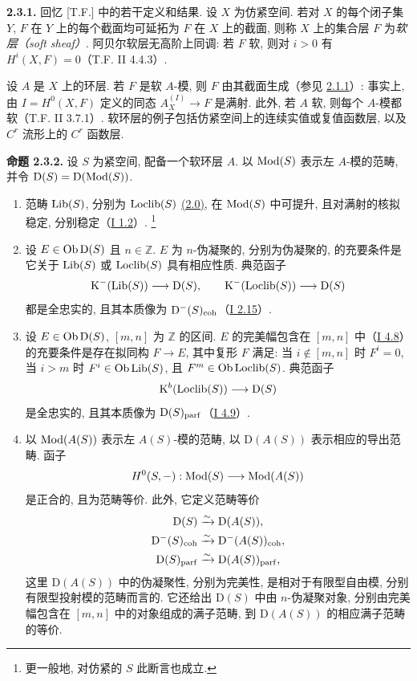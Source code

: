 \textbf{2.3.1.} 回忆 [T.F.] 中的若干定义和结果. 设 $X$ 为仿紧空间. 若对 $X$ 的每个闭子集 $Y$, $F$ 在 $Y$ 上的每个截面均可延拓为 $F$ 在 $X$ 上的截面, 则称 $X$ 上的集合层 $F$ 为\emph{软层（soft sheaf）}. 阿贝尔软层无高阶上同调: 若 $F$ 软, 则对 $i>0$ 有 $H^i(X,F)=0$（T.F. II 4.4.3）.

设 $A$ 是 $X$ 上的环层. 若 $F$ 是软 $A$-模, 则 $F$ 由其截面生成（参见 \hyperlink{sga6.e02.lem.2-1-1}{2.1.1}）: 事实上, 由 $I=H^0(X,F)$ 定义的同态 $A_X^{(I)}\to F$ 是满射. 此外, 若 $A$ 软, 则每个 $A$-模都软（T.F. II 3.7.1）. 软环层的例子包括仿紧空间上的连续实值或复值函数层, 以及 $C^r$ 流形上的 $C^r$ 函数层.

\textbf{命题 2.3.2.} 设 $S$ 为紧空间, 配备一个软环层 $A$. 以 $\operatorname{Mod}(S)$ 表示左 $A$-模的范畴, 并令 $\mathrm D(S)=\mathrm D(\operatorname{Mod}(S))$.
\begin{enumerate}[label=\alph*)]
\item 范畴 $\operatorname{Lib}(S)$, 分别为 $\operatorname{Loclib}(S)$ \hyperlink{sga6.e02.sec.2.0}{(2.0)}, 在 $\operatorname{Mod}(S)$ 中可提升, 且对满射的核拟稳定, 分别稳定（\hyperlink{sga6.e01.sec.1.2}{I 1.2}）. \footnote{更一般地, 对仿紧的 $S$ 此断言也成立.}
\item 设 $E\in\operatorname{Ob}\mathrm D(S)$ 且 $n\in\mathbb Z$. $E$ 为 $n$-伪凝聚的, 分别为伪凝聚的, 的充要条件是它关于 $\operatorname{Lib}(S)$ 或 $\operatorname{Loclib}(S)$ 具有相应性质. 典范函子
\[
\mathrm K^{-}(\operatorname{Lib}(S))\longrightarrow \mathrm D(S),
\qquad
\mathrm K^{-}(\operatorname{Loclib}(S))\longrightarrow \mathrm D(S)
\]
都是全忠实的, 且其本质像为 $\mathrm D^{-}(S)_{\mathrm{coh}}$（\hyperlink{sga6.e01.ex.2-15}{I 2.15}）.
\item 设 $E\in\operatorname{Ob}\mathrm D(S)$, $[m,n]$ 为 $\mathbb Z$ 的区间. $E$ 的完美幅包含在 $[m,n]$ 中（\hyperlink{sga6.e01.ex.4-8}{I 4.8}）的充要条件是存在拟同构 $F\to E$, 其中复形 $F$ 满足: 当 $i\notin[m,n]$ 时 $F^i=0$, 当 $i>m$ 时 $F^i\in\operatorname{Ob}\operatorname{Lib}(S)$, 且 $F^m\in\operatorname{Ob}\operatorname{Loclib}(S)$. 典范函子
\[
\mathrm K^b(\operatorname{Loclib}(S))\longrightarrow \mathrm D(S)
\]
是全忠实的, 且其本质像为 $\mathrm D(S)_{\mathrm{parf}}$（\hyperlink{sga6.e01.notation.4-9}{I 4.9}）.
\item 以 $\operatorname{Mod}(A(S))$ 表示左 $A(S)$-模的范畴, 以 $\mathrm D(A(S))$ 表示相应的导出范畴. 函子
\[
H^0(S,-):\operatorname{Mod}(S)\longrightarrow\operatorname{Mod}(A(S))
\]
是正合的, 且为范畴等价. 此外, 它定义范畴等价
\[
\begin{aligned}
\mathrm D(S)&\xrightarrow{\sim}\mathrm D(A(S)),\\
\mathrm D^{-}(S)_{\mathrm{coh}}&\xrightarrow{\sim}\mathrm D^{-}(A(S))_{\mathrm{coh}},\\
\mathrm D(S)_{\mathrm{parf}}&\xrightarrow{\sim}\mathrm D(A(S))_{\mathrm{parf}},
\end{aligned}
\]
这里 $\mathrm D(A(S))$ 中的伪凝聚性, 分别为完美性, 是相对于有限型自由模, 分别有限型投射模的范畴而言的. 它还给出 $\mathrm D(S)$ 中由 $n$-伪凝聚对象, 分别由完美幅包含在 $[m,n]$ 中的对象组成的满子范畴, 到 $\mathrm D(A(S))$ 的相应满子范畴的等价.
\end{enumerate}

